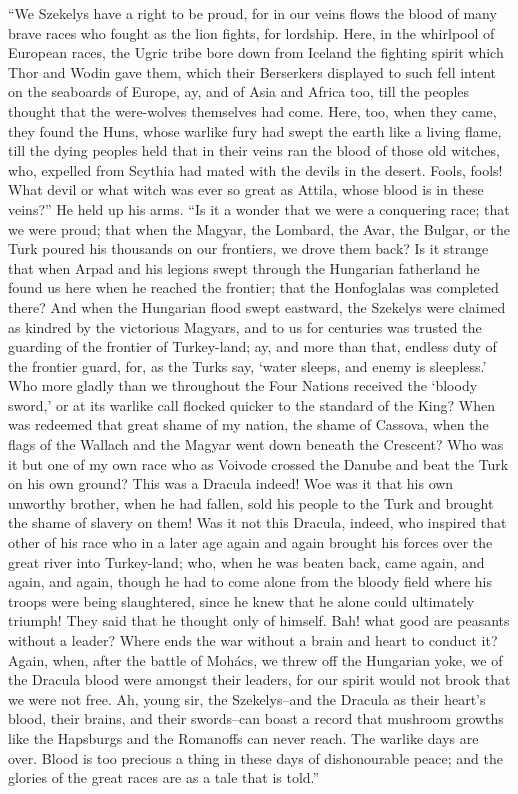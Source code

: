 \documentclass[12pt,openright]{book}
\begin{document}
“We Szekelys have a right to be proud, for in our veins flows the blood of many brave races who fought as the lion fights, for lordship. Here, in the whirlpool of European races, the Ugric tribe bore down from Iceland the fighting spirit which Thor and Wodin gave them, which their Berserkers displayed to such fell intent on the seaboards of Europe, ay, and of Asia and Africa too, till the peoples thought that the were-wolves themselves had come. Here, too, when they came, they found the Huns, whose warlike fury had swept the earth like a living flame, till the dying peoples held that in their veins ran the blood of those old witches, who, expelled from Scythia had mated with the devils in the desert. Fools, fools! What devil or what witch was ever so great as Attila, whose blood is in these veins?” He held up his arms. “Is it a wonder that we were a conquering race; that we were proud; that when the Magyar, the Lombard, the Avar, the Bulgar, or the Turk poured his thousands on our frontiers, we drove them back? Is it strange that when Arpad and his legions swept through the Hungarian fatherland he found us here when he reached the frontier; that the Honfoglalas was completed there? And when the Hungarian flood swept eastward, the Szekelys were claimed as kindred by the victorious Magyars, and to us for centuries was trusted the guarding of the frontier of Turkey-land; ay, and more than that, endless duty of the frontier guard, for, as the Turks say, ‘water sleeps, and enemy is sleepless.’ Who more gladly than we throughout the Four Nations received the ‘bloody sword,’ or at its warlike call flocked quicker to the standard of the King? When was redeemed that great shame of my nation, the shame of Cassova, when the flags of the Wallach and the Magyar went down beneath the Crescent? Who was it but one of my own race who as Voivode crossed the Danube and beat the Turk on his own ground? This was a Dracula indeed! Woe was it that his own unworthy brother, when he had fallen, sold his people to the Turk and brought the shame of slavery on them! Was it not this Dracula, indeed, who inspired that other of his race who in a later age again and again brought his forces over the great river into Turkey-land; who, when he was beaten back, came again, and again, and again, though he had to come alone from the bloody field where his troops were being slaughtered, since he knew that he alone could ultimately triumph! They said that he thought only of himself. Bah! what good are peasants without a leader? Where ends the war without a brain and heart to conduct it? Again, when, after the battle of Mohács, we threw off the Hungarian yoke, we of the Dracula blood were amongst their leaders, for our spirit would not brook that we were not free. Ah, young sir, the Szekelys–and the Dracula as their heart’s blood, their brains, and their swords–can boast a record that mushroom growths like the Hapsburgs and the Romanoffs can never reach. The warlike days are over. Blood is too precious a thing in these days of dishonourable peace; and the glories of the great races are as a tale that is told.”
\end{document}
